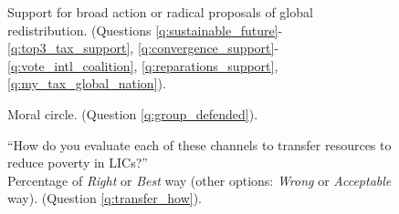 \documentclass[12pt,english]{article}
\begin{document}
\begin{bibunit}
\begin{figure}[h!]
\end{figure}
\begin{figure}[h!]
    \caption[Support for broad or radical global redistribution]{Support for broad action or radical proposals of global redistribution. \hfill (Questions \ref{q:sustainable_future}-\ref{q:top3_tax_support}, \ref{q:convergence_support}-\ref{q:vote_intl_coalition}, \ref{q:reparations_support}, \ref{q:my_tax_global_nation}).
    }\label{fig:radical_redistr_share} 
\end{figure}
\begin{figure}[h!]
    \caption[Moral circle]{Moral circle. (Question \ref{q:group_defended}).
    }\label{fig:group_defended}
\end{figure}
\begin{figure}[h!]
    \caption[\textit{Right} or \textit{Best} way to transfer resources to LICs (global average)]{``How do you evaluate each of these channels to transfer resources to reduce poverty in LICs?''\\ Percentage of \textit{Right} or \textit{Best} way (other options: \textit{Wrong} or \textit{Acceptable} way). (Question \ref{q:transfer_how}).
}
\end{figure}
\end{bibunit}
\end{document}
